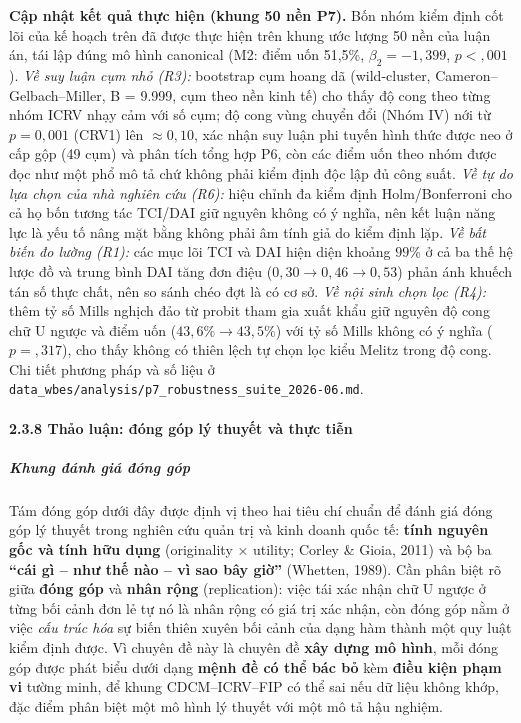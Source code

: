 \documentclass[
  a4paper,
  13pt]{extreport}
\begin{document}
\textbf{Cập nhật kết quả thực hiện (khung 50 nền P7).} Bốn nhóm kiểm
định cốt lõi của kế hoạch trên đã được thực hiện trên khung ước lượng 50
nền của luận án, tái lập đúng mô hình canonical (M2: điểm uốn 51,5\%,
\(\beta_2 = -1{,}399\), \(p < {,}001\)). \emph{Về suy luận cụm nhỏ
(R3):} bootstrap cụm hoang dã (wild-cluster, Cameron--Gelbach--Miller, B
= 9.999, cụm theo nền kinh tế) cho thấy độ cong theo từng nhóm ICRV nhạy
cảm với số cụm; độ cong vùng chuyển đổi (Nhóm IV) nới từ \(p = 0{,}001\)
(CRV1) lên \(\approx 0{,}10\), xác nhận suy luận phi tuyến hình thức
được neo ở cấp gộp (49 cụm) và phân tích tổng hợp P6, còn các điểm uốn
theo nhóm được đọc như một phổ mô tả chứ không phải kiểm định độc lập đủ
công suất. \emph{Về tự do lựa chọn của nhà nghiên cứu (R6):} hiệu chỉnh
đa kiểm định Holm/Bonferroni cho cả họ bốn tương tác TCI/DAI giữ nguyên
không có ý nghĩa, nên kết luận năng lực là yếu tố nâng mặt bằng không
phải âm tính giả do kiểm định lặp. \emph{Về bất biến đo lường (R1):} các
mục lõi TCI và DAI hiện diện khoảng \(99\%\) ở cả ba thế hệ lược đồ và
trung bình DAI tăng đơn điệu (\(0{,}30 \to 0{,}46 \to 0{,}53\)) phản ánh
khuếch tán số thực chất, nên so sánh chéo đợt là có cơ sở. \emph{Về nội
sinh chọn lọc (R4):} thêm tỷ số Mills nghịch đảo từ probit tham gia xuất
khẩu giữ nguyên độ cong chữ U ngược và điểm uốn
(\(43{,}6\% \to 43{,}5\%\)) với tỷ số Mills không có ý nghĩa
(\(p = {,}317\)), cho thấy không có thiên lệch tự chọn lọc kiểu Melitz
trong độ cong. Chi tiết phương pháp và số liệu ở
\texttt{data\_wbes/analysis/p7\_robustness\_suite\_2026-06.md}.

\hypertarget{thux1ea3o-luux1eadn-ux111uxf3ng-guxf3p-luxfd-thuyux1ebft-vuxe0-thux1ef1c-tiux1ec5n}{%
\paragraph{2.3.8 Thảo luận: đóng góp lý thuyết và thực
tiễn}\label{thux1ea3o-luux1eadn-ux111uxf3ng-guxf3p-luxfd-thuyux1ebft-vuxe0-thux1ef1c-tiux1ec5n}}

\hypertarget{khung-ux111uxe1nh-giuxe1-ux111uxf3ng-guxf3p}{%
\subparagraph{Khung đánh giá đóng
góp}\label{khung-ux111uxe1nh-giuxe1-ux111uxf3ng-guxf3p}}

Tám đóng góp dưới đây được định vị theo hai tiêu chí chuẩn để đánh giá
đóng góp lý thuyết trong nghiên cứu quản trị và kinh doanh quốc tế:
\textbf{tính nguyên gốc và tính hữu dụng} (originality × utility; Corley
\& Gioia, 2011) và bộ ba \textbf{``cái gì -- như thế nào -- vì sao bây
giờ''} (Whetten, 1989). Cần phân biệt rõ giữa \textbf{đóng góp} và
\textbf{nhân rộng} (replication): việc tái xác nhận chữ U ngược ở từng
bối cảnh đơn lẻ tự nó là nhân rộng có giá trị xác nhận, còn đóng góp nằm
ở việc \emph{cấu trúc hóa} sự biến thiên xuyên bối cảnh của dạng hàm
thành một quy luật kiểm định được. Vì chuyên đề này là chuyên đề
\textbf{xây dựng mô hình}, mỗi đóng góp được phát biểu dưới dạng
\textbf{mệnh đề có thể bác bỏ} kèm \textbf{điều kiện phạm vi} tường
minh, để khung CDCM--ICRV--FIP có thể sai nếu dữ liệu không khớp, đặc
điểm phân biệt một mô hình lý thuyết với một mô tả hậu nghiệm.
\end{document}
